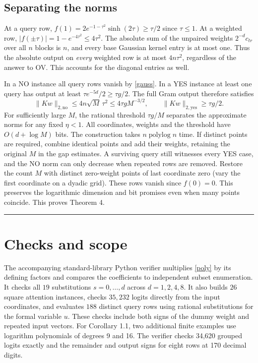 \documentclass[11pt,letterpaper]{article}
\newcommand{\norm}[1]{\lVert#1\rVert}
\newcommand{\qedmark}{\unskip\nobreak\hfill\rule{0.5em}{0.5em}}
\begin{document}
\subsection*{Separating the norms}
At a query row, $f(1)=2e^{-1-\tau^2}\sinh(2\tau)\ge\tau/2$ since $\tau\le1$. At a weighted row, $|f(\pm\tau)|=1-e^{-4\tau^2}\le4\tau^2$. The absolute sum of the unpaired weights $2^{-d}c_{tr}$ over all $n$ blocks is $n$, and every base Gaussian kernel entry is at most one. Thus the absolute output on \emph{every} weighted row is at most $4n\tau^2$, regardless of the answer to OV. This accounts for the diagonal entries as well.

In a NO instance all query rows vanish by \eqref{gauss}. In a YES instance at least one query has output at least $\tau e^{-5d}/2\ge\tau g/2$. The full Gram output therefore satisfies
\[
 \norm{Kw}_{2,\mathrm{no}}\le4n\sqrt M\,\tau^2
 \le4\tau g M^{-3/2},\qquad
 \norm{Kw}_{2,\mathrm{yes}}\ge\tau g/2 .
\]
For sufficiently large $M$, the rational threshold $\tau g/M$ separates the approximate norms for any fixed $\eta<1$. All coordinates, weights and the threshold have $O(d+\log M)$ bits. The construction takes $n\operatorname{polylog}n$ time. If distinct points are required, combine identical points and add their weights, retaining the original $M$ in the gap estimates. A surviving query still witnesses every YES case, and the NO norm can only decrease when repeated rows are removed. Restore the count $M$ with distinct zero-weight points of last coordinate zero (vary the first coordinate on a dyadic grid). These rows vanish since $f(0)=0$. This preserves the logarithmic dimension and bit promises even when many points coincide. This proves Theorem 4. \qedmark

\section{Checks and scope}
The accompanying standard-library Python verifier multiplies \eqref{poly} by its defining factors and compares the coefficients to independent subset enumeration. It checks all $19$ substitutions $s=0,\ldots,d$ across $d=1,2,4,8$. It also builds $26$ square attention instances, checks $35{,}232$ logits directly from the input coordinates, and evaluates $188$ distinct query rows using rational substitutions for the formal variable $u$. These checks include both signs of the dummy weight and repeated input vectors. For Corollary 1.1, two additional finite examples use logarithm polynomials of degrees 9 and 16. The verifier checks 34,620 grouped logits exactly and the remainder and output signs for eight rows at 170 decimal digits.
\end{document}
